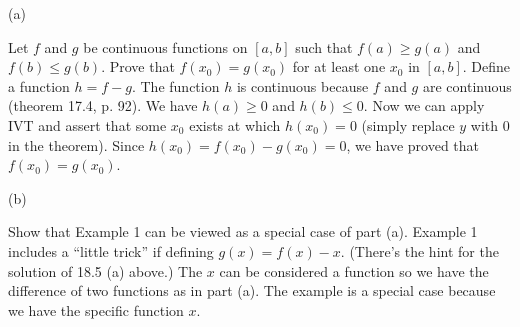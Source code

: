  (a)

Let $f$ and $g$ be continuous functions on $[a,b]$ such that
$f(a)\ge g(a)$ and $f(b)\le g(b)$. Prove that $f(x_0)=g(x_0)$ for at least
one $x_0$ in $[a,b]$.
\medskip
Define a function $h=f-g.$
The function $h$ is continuous because $f$ and $g$ are continuous
(theorem 17.4, p. 92).
We have $h(a)\ge0$ and $h(b)\le0$.
Now we can apply IVT and assert that some $x_0$ exists at which $h(x_0)=0$
(simply replace $y$ with 0 in the theorem).
Since $h(x_0)=f(x_0)-g(x_0)=0$, we have proved that $f(x_0)=g(x_0)$.

 (b)

Show that Example 1 can be viewed as a special case of part (a).
\medskip
Example 1 includes a ``little trick'' if defining $g(x)=f(x)-x$.
(There's the hint for the solution of 18.5 (a) above.)
The $x$ can be considered a function so we have the difference of two
functions as in part (a). The example is a special case because we have the
specific function $x$.

